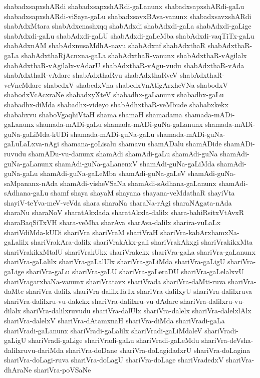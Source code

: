 {shabadxsapxshARdi
shabadxsapxshARdi-gaLanunx
shabadxsapxshARdi-gaLu
shabadxsapxshARdi-viSaya-gaLu
shabadxsavxBAva-vanunx
shabadxsavxshARdi
shabAdxMtara
shabAdxcnashxqq
shabAdxdi
shabAdxdi-gaLa
shabAdxdi-gaLige
shabAdxdi-gaLu
shabAdxdi-gaLU
shabAdxdi-gaLeMba
shabAdxdi-vaqTiTx-gaLu
shabAdxnAM
shabAdxnusaMdhA-navu
shabAdxnf
shabAdxthaR
shabAdxthaR-gaLa
shabAdxthaRjAcnxna-gaLa
shabAdxthaR-vanunx
shabAdxthaR-vAgilalx
shabAdxthaR-vAgilalx-vAdarU
shabAdxthaR-vAgu-vudu
shabAdxthaR-vAda
shabAdxthaR-vAdare
shabAdxthaRvu
shabAdxthaRveV
shabAdxthaR-veVneMdare
shabedxV
shabedxVna
shabedxVnAtigArxheVNa
shabodxV
shabodxVcAcxraNe
shabadxyXteV
shabadhx-gaLanunx
shabadhx-gaLu
shabadhx-diMda
shabadhx-videyo
shabAdhxthaR-veMbude
shababxkekx
shababxvu
shaboVgaqhiVtaH
shama
shamaH
shamadama
shamada-mADi-gaLanunx
shamada-mADi-gaLu
shamada-mADi-guNa-gaLanunx
shamada-mADi-guNa-gaLiMda-kUDi
shamada-mADi-guNa-gaLu
shamada-mADi-guNa-gaLuLaLxva-nAgi
shamana-goLisalu
shamavu
shamADalu
shamADide
shamADi-ruvudu
shamADu-vu-danunx
shamAdi
shamAdi-gaLu
shamAdi-guNa
shamAdi-guNa-gaLanunx
shamAdi-guNa-gaLanenxV
shamAdi-guNa-gaLiMda
shamAdi-guNa-gaLu
shamAdi-guNa-gaLeMba
shamAdi-guNa-gaLeV
shamAdi-guNa-saMpananx-nAda
shamAdi-visheVSaNa
shamAdi-sAdhana-gaLanunx
shamAdi-sAdhana-gaLu
shamf
shaya
shayaM
shayana
shayana-veMdathaR
shayiVta
shayiV-teYva-meV-veVda
shara
sharaNa
sharaNa-rAgi
sharaNAgata-nAda
sharaNu
sharaNoV
sharatAkxlada
sharatAkxla-dalilx
shara-bahiRsitxVtAvxR
sharaBaqSiTxVH
shara-veMba
sharAva
sharAva-dalilx
sharira-vuLaLx
shariVdiMda-kUDi
shariVra
shariVraM
shariVraH
shariVra-kabArxhamxNa-gaLalilx
shariVrakAra-dalilx
shariVrakAkx-gali
shariVrakAkxgi
shariVrakikxMta
shariVrakikxMtalU
shariVrakUkx
shariVrakekx
shariVra-gaLa
shariVra-gaLanunx
shariVra-gaLalilx
shariVra-gaLalUlx
shariVra-gaLiMda
shariVra-gaLigU
shariVra-gaLige
shariVra-gaLu
shariVra-gaLU
shariVra-gaLeraDU
shariVra-gaLelalxvU
shariVragarxhaNa-vanunx
shariVratavx
shariVrada
shariVra-daMti-ruva
shariVra-daMte
shariVra-dalilx
shariVra-dalilxTaTx
shariVra-dalilxyU
shariVra-dalilxruva
shariVra-dalilxru-vu-dakekx
shariVra-dalilxru-vu-dAdare
shariVra-dalilxru-vu-dilalx
shariVra-dalilxruvudu
shariVra-dalUlx
shariVra-dalelx
shariVra-dalelxlAlx
shariVra-dalelxV
shariVra-dAtamxnaH
shariVra-diMda
shariVradi-gaLa
shariVradi-gaLanunx
shariVradi-gaLalilx
shariVradi-gaLiMdaleV
shariVradi-gaLigU
shariVradi-gaLige
shariVradi-gaLu
shariVradi-gaLeMdu
shariVra-deVsha-dalilxruvu-dariMda
shariVra-doDane
shariVra-doLagidadxrU
shariVra-doLagina
shariVra-doLagi-ruva
shariVra-doLagU
shariVra-doLage
shariVradedxV
shariVra-dhAraNe
shariVra-poVSaNe
}
